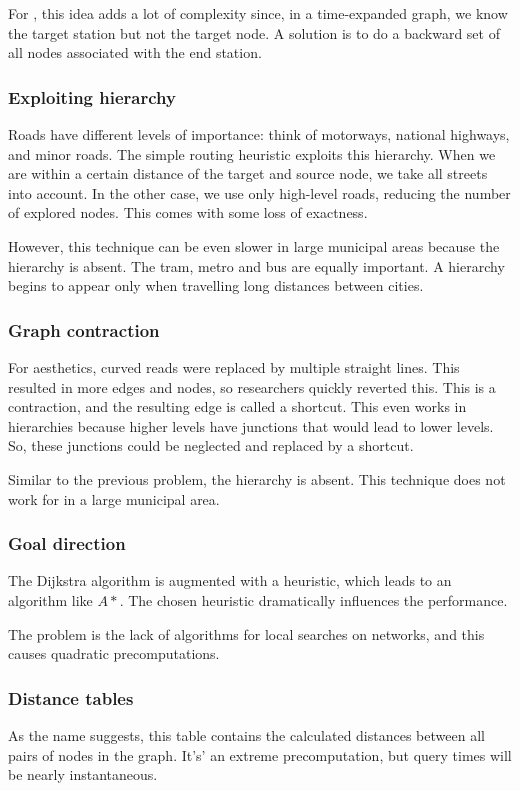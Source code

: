For , this idea adds a lot of complexity since, in a time-expanded graph, we know the target station but not the target node. A solution is to do a backward set of all nodes associated with the end station.
\subsubsection{Exploiting hierarchy}
Roads have different levels of importance: think of motorways, national highways, and minor roads. The simple routing heuristic exploits this hierarchy. When we are within a certain distance of the target and source node, we take all streets into account. In the other case, we use only high-level roads, reducing the number of explored nodes. This comes with some loss of exactness.

However, this technique can be even slower in large municipal areas because the hierarchy is absent. The tram, metro and bus are equally important. A hierarchy begins to appear only when travelling long distances between cities. 
\subsubsection{Graph contraction}
For aesthetics, curved reads were replaced by multiple straight lines. This resulted in more edges and nodes, so researchers quickly reverted this. This is a contraction, and the resulting edge is called a shortcut. This even works in hierarchies because higher levels have junctions that would lead to lower levels. So, these junctions could be neglected and replaced by a shortcut. 

Similar to the previous problem, the hierarchy is absent. This technique does not work for  in a large municipal area.
\subsubsection{Goal direction}
The Dijkstra algorithm is augmented with a heuristic, which leads to an algorithm like $ A*$. The chosen heuristic dramatically influences the performance.

The problem is the lack of algorithms for local searches on  networks, and this causes quadratic precomputations.
\subsubsection{Distance tables}
As the name suggests, this table contains the calculated distances between all pairs of nodes in the graph. It's' an extreme precomputation, but query times will be nearly instantaneous. 

